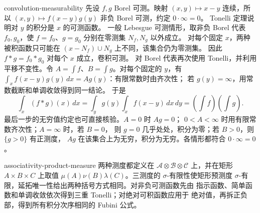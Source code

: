 \begin{solution}{convolution-measurability}
先设 \(f,g\) Borel 可测。映射 \((x,y)\mapsto x-y\) 连续，所以
\((x,y)\mapsto f(x-y)g(y)\) 非负 Borel 可测，约定 \(0\cdot\infty=0\)。
Tonelli 定理说明对 \(y\) 的积分是 \(x\) 的可测函数。
一般 Lebesgue 可测情形，取非负 Borel 代表 \(f_0,g_0\)，使
\(f=f_0\)、\(g=g_0\) 分别在零测集 \(N_f,N_g\) 以外成立。
对每个固定 \(x\)，两种被积函数只可能在
\((x-N_f)\cup N_g\) 上不同，该集合仍为零测集。
因此 \(f*g=f_0*g_0\) 对每个 \(x\) 成立，卷积可测。
对 Borel 代表再次使用 Tonelli，并利用平移不变性。令
\(A=\int f\)、\(B=\int g\)。对每个固定的 \(y\)，有
\(\int_x f(x-y)g(y)\,dx=A g(y)\)：有限常数时由齐次性；
若 \(g(y)=\infty\)，用常数截断和单调收敛得到同一结论。
于是
\[
 \int_x(f*g)(x)\,dx
 =\int_y g(y)\int_x f(x-y)\,dx\,dy
 =\left(\int f\right)\left(\int g\right).
\]
最后一步的无穷值约定也可直接核验。\(A=0\) 时 \(Ag=0\)；
\(0<A<\infty\) 时用有限常数齐次性；\(A=\infty\) 时，若 \(B=0\)，
则 \(g=0\) 几乎处处，积分为零；若 \(B>0\)，则 \(\{g>0\}\) 有正测度，
\(Ag\) 在该集合上为无穷，积分为无穷。各情形都符合 \(0\cdot\infty=0\)。
\end{solution}

\begin{solution}{associativity-product-measure}
两种测度都定义在
\(\mathcal A\otimes\mathcal B\otimes\mathcal C\) 上，并在矩形
\(A\times B\times C\) 上取值
\(\mu(A)\nu(B)\lambda(C)\)。三测度的 \(\sigma\)-有限性使矩形预测度
\(\sigma\)-有限，延拓唯一性给出两种括号方式相同。对非负可测函数先由
指示函数、简单函数和单调收敛依次得到三重 Tonelli；对绝对可积函数应用于
绝对值，再拆正负部，得到所有积分次序相同的 Fubini 公式。
\end{solution}
